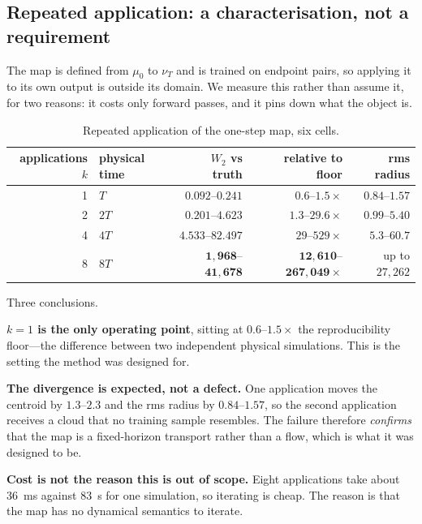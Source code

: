 ﻿\documentclass[11pt,a4paper]{article}
\newcommand{\Wtwo}{W_2}
\begin{document}
\subsection{Repeated application: a characterisation, not a requirement}
\label{sec:rollout}

The map is defined from $\mu_0$ to $\nu_T$ and is trained on endpoint pairs, so applying it to
its own output is outside its domain. We measure this rather than assume it, for two reasons: it
costs only forward passes, and it pins down what the object is.

\begin{table}[h]
\centering\small
\begin{tabular}{@{}rlrrr@{}}
\toprule
applications $k$ & physical time & $\Wtwo$ vs truth & relative to floor & rms radius \\
\midrule
1 & $T$ & $0.092$--$0.241$ & $\mathbf{0.6}$--$\mathbf{1.5\times}$ & $0.84$--$1.57$ \\
2 & $2T$ & $0.201$--$4.623$ & $1.3$--$29.6\times$ & $0.99$--$5.40$ \\
4 & $4T$ & $4.533$--$82.497$ & $29$--$529\times$ & $5.3$--$60.7$ \\
8 & $8T$ & $\mathbf{1{,}968}$--$\mathbf{41{,}678}$ &
  $\mathbf{12{,}610}$--$\mathbf{267{,}049\times}$ & up to $27{,}262$ \\
\bottomrule
\end{tabular}
\caption{Repeated application of the one-step map, six cells.}
\end{table}

Three conclusions.

\textbf{$k=1$ is the only operating point}, sitting at $0.6$--$1.5\times$ the reproducibility
floor---the difference between two independent physical simulations. This is the setting the
method was designed for.

\textbf{The divergence is expected, not a defect.} One application moves the centroid by
$1.3$--$2.3$ and the rms radius by $0.84$--$1.57$, so the second application receives a cloud
that no training sample resembles. The failure therefore \emph{confirms} that the map is a
fixed-horizon transport rather than a flow, which is what it was designed to be.

\textbf{Cost is not the reason this is out of scope.} Eight applications take about
\SI{36}{\milli\second} against \SI{83}{\second} for one simulation, so iterating is cheap. The
reason is that the map has no dynamical semantics to iterate.
\end{document}
